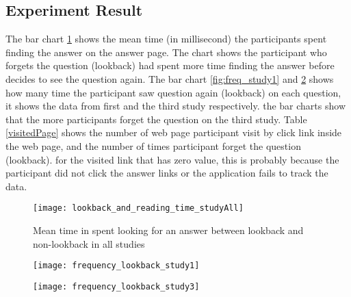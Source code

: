 \subsection{Experiment Result}
The bar chart \ref{fig:lookingAnswer_lookback} shows the mean time (in millisecond) the participants spent finding the answer on the answer page.
The chart shows the participant who forgets the question (lookback) had spent more time finding the answer before decides to see the question again.
The bar chart \ref{fig:freq_study1} and \ref{fig:freq_study3} shows how many time the participant saw question again (lookback) on each question, it shows the data from first and the third study respectively.
the bar charts show that the more participants forget the question on the third study.
Table \ref{visitedPage} shows the number of web page participant visit by click link inside the web page, and the number of times participant forget the question (lookback).
for the visited link that has zero value, this is probably because the participant did not click the answer links or the application fails to track the data.
\begin{figure}[!h]
\begin{center}
\texttt{[image: lookback\_and\_reading\_time\_studyAll]}
\end{center}
\captionsetup{justification=centering}
\caption{Mean time in spent looking for an answer between lookback and non-lookback in all studies}
\label{fig:lookingAnswer_lookback}
\end{figure}

\begin{figure}[!h]
\centering
\begin{minipage}{.5\textwidth}
  \centering
  \texttt{[image: frequency\_lookback\_study1]}
  \captionsetup{justification=centering}
  \label{fig:freq_study1}
\end{minipage}%
\begin{minipage}{.5\textwidth}
  \centering
  \texttt{[image: frequency\_lookback\_study3]}
  \captionsetup{justification=centering}
  \label{fig:freq_study3}
\end{minipage}
\end{figure}

